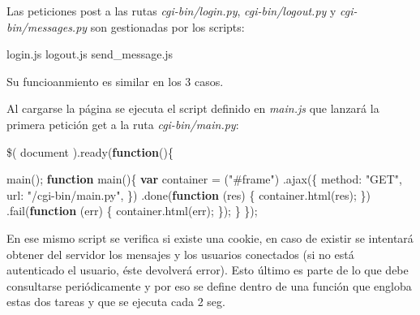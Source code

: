 \documentclass[12pt]{extarticle}
\newenvironment{Shaded}{}{}
\newcommand{\KeywordTok}[1]{\textcolor[rgb]{0.00,0.44,0.13}{\textbf{{#1}}}}
\newcommand{\DataTypeTok}[1]{\textcolor[rgb]{0.56,0.13,0.00}{{#1}}}
\newcommand{\StringTok}[1]{\textcolor[rgb]{0.25,0.44,0.63}{{#1}}}
\newcommand{\NormalTok}[1]{{#1}}
\newcommand{\VariableTok}[1]{\textcolor[rgb]{0.10,0.09,0.49}{{#1}}}
\newcommand{\OperatorTok}[1]{\textcolor[rgb]{0.40,0.40,0.40}{{#1}}}
\newcommand{\AttributeTok}[1]{\textcolor[rgb]{0.49,0.56,0.16}{{#1}}}
\begin{document}
Las peticiones post a las rutas \emph{cgi-bin/login.py},
\emph{cgi-bin/logout.py} y \emph{cgi-bin/messages.py} son gestionadas
por los scripts:

\begin{Shaded}
\begin{Highlighting}[]
\VariableTok{login}\NormalTok{.}\AttributeTok{js} 
\VariableTok{logout}\NormalTok{.}\AttributeTok{js}
\VariableTok{send_message}\NormalTok{.}\AttributeTok{js}
\end{Highlighting}
\end{Shaded}

Su funcioanmiento es similar en los 3 casos.

Al cargarse la página se ejecuta el script definido en \emph{main.js}
que lanzará la primera petición get a la ruta \emph{cgi-bin/main.py}:

\begin{Shaded}
\begin{Highlighting}[]
\AttributeTok{\$}\NormalTok{( document ).}\AttributeTok{ready}\NormalTok{(}\KeywordTok{function}\NormalTok{()}\OperatorTok{\{}
    
    \AttributeTok{main}\NormalTok{()}\OperatorTok{;}
    \KeywordTok{function} \AttributeTok{main}\NormalTok{()}\OperatorTok{\{}
        \KeywordTok{var}\NormalTok{ container }\OperatorTok{=}\NormalTok{  (}\StringTok{"#frame"}\NormalTok{)}
\NormalTok{        .}\AttributeTok{ajax}\NormalTok{(}\OperatorTok{\{}
            \DataTypeTok{method}\OperatorTok{:} \StringTok{"GET"}\OperatorTok{,}
            \DataTypeTok{url}\OperatorTok{:} \StringTok{"/cgi-bin/main.py"}\OperatorTok{,}
        \OperatorTok{\}}\NormalTok{)}
\NormalTok{        .}\AttributeTok{done}\NormalTok{(}\KeywordTok{function}\NormalTok{ (res) }\OperatorTok{\{}
            \VariableTok{container}\NormalTok{.}\AttributeTok{html}\NormalTok{(res)}\OperatorTok{;}
        \OperatorTok{\}}\NormalTok{)}
\NormalTok{        .}\AttributeTok{fail}\NormalTok{(}\KeywordTok{function}\NormalTok{ (err) }\OperatorTok{\{}
            \VariableTok{container}\NormalTok{.}\AttributeTok{html}\NormalTok{(err)}\OperatorTok{;}
        \OperatorTok{\}}\NormalTok{)}\OperatorTok{;} 
    \OperatorTok{\}}
\OperatorTok{\}}\NormalTok{)}\OperatorTok{;}
\end{Highlighting}
\end{Shaded}

En ese mismo script se verifica si existe una cookie, en caso de existir
se intentará obtener del servidor los mensajes y los usuarios conectados
(si no está autenticado el usuario, éste devolverá error). Esto último
es parte de lo que debe consultarse periódicamente y por eso se define
dentro de una función que engloba estas dos tareas y que se ejecuta cada
2 seg.
\end{document}
